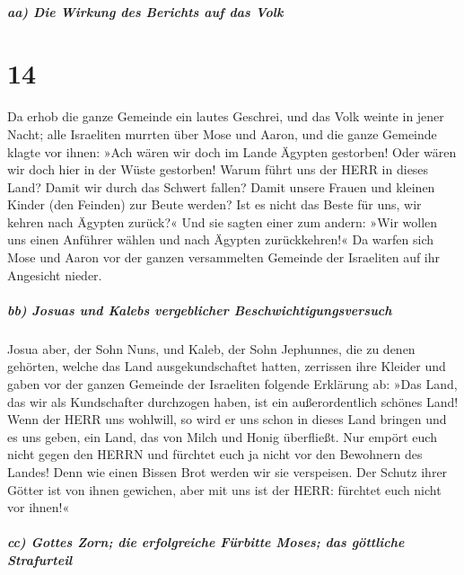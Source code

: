 \hypertarget{aa-die-wirkung-des-berichts-auf-das-volk}{%
\subparagraph{aa) Die Wirkung des Berichts auf das
Volk}\label{aa-die-wirkung-des-berichts-auf-das-volk}}

\hypertarget{section-13}{%
\section{14}\label{section-13}}

Da erhob die ganze Gemeinde ein lautes Geschrei, und das
Volk weinte in jener Nacht; alle Israeliten murrten über
Mose und Aaron, und die ganze Gemeinde klagte vor ihnen: »Ach wären wir
doch im Lande Ägypten gestorben! Oder wären wir doch hier in der Wüste
gestorben! Warum führt uns der HERR in dieses Land? Damit
wir durch das Schwert fallen? Damit unsere Frauen und kleinen Kinder
(den Feinden) zur Beute werden? Ist es nicht das Beste für uns, wir
kehren nach Ägypten zurück?« Und sie sagten einer zum
andern: »Wir wollen uns einen Anführer wählen und nach Ägypten
zurückkehren!« Da warfen sich Mose und Aaron vor der
ganzen versammelten Gemeinde der Israeliten auf ihr Angesicht nieder.

\hypertarget{bb-josuas-und-kalebs-vergeblicher-beschwichtigungsversuch}{%
\subparagraph{bb) Josuas und Kalebs vergeblicher
Beschwichtigungsversuch}\label{bb-josuas-und-kalebs-vergeblicher-beschwichtigungsversuch}}

Josua aber, der Sohn Nuns, und Kaleb, der Sohn Jephunnes,
die zu denen gehörten, welche das Land ausgekundschaftet hatten,
zerrissen ihre Kleider und gaben vor der ganzen Gemeinde
der Israeliten folgende Erklärung ab: »Das Land, das wir als
Kundschafter durchzogen haben, ist ein außerordentlich schönes Land!
Wenn der HERR uns wohlwill, so wird er uns schon in dieses
Land bringen und es uns geben, ein Land, das von Milch und Honig
überfließt. Nur empört euch nicht gegen den HERRN und
fürchtet euch ja nicht vor den Bewohnern des Landes! Denn wie einen
Bissen Brot werden wir sie verspeisen. Der Schutz ihrer Götter ist von
ihnen gewichen, aber mit uns ist der HERR: fürchtet euch nicht vor
ihnen!«

\hypertarget{cc-gottes-zorn-die-erfolgreiche-fuxfcrbitte-moses-das-guxf6ttliche-strafurteil}{%
\subparagraph{cc) Gottes Zorn; die erfolgreiche Fürbitte Moses; das
göttliche
Strafurteil}\label{cc-gottes-zorn-die-erfolgreiche-fuxfcrbitte-moses-das-guxf6ttliche-strafurteil}}

